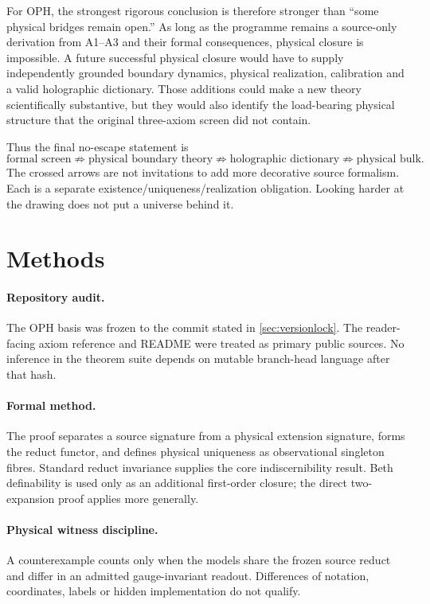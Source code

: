 \documentclass[10pt,a4paper]{article}
\theoremstyle{definition}
\theoremstyle{remark}
\begin{document}
For OPH, the strongest rigorous conclusion is therefore stronger than ``some
physical bridges remain open.''  As long as the programme remains a
source-only derivation from A1--A3 and their formal consequences, physical
closure is impossible.  A future successful physical closure would have to
supply independently grounded boundary dynamics, physical realization,
calibration and a valid holographic dictionary.  Those additions could make a
new theory scientifically substantive, but they would also identify the
load-bearing physical structure that the original three-axiom screen did not
contain.

Thus the final no-escape statement is
\[
\boxed{
\text{formal screen}
\not\Rightarrow
\text{physical boundary theory}
\not\Rightarrow
\text{holographic dictionary}
\not\Rightarrow
\text{physical bulk}.}
\]
The crossed arrows are not invitations to add more decorative source
formalism.  Each is a separate existence/uniqueness/realization obligation.
Looking harder at the drawing does not put a universe behind it.

\section*{Methods}

\paragraph{Repository audit.}
The OPH basis was frozen to the commit stated in \cref{sec:versionlock}.  The
reader-facing axiom reference and README were treated as primary public
sources.  No inference in the theorem suite depends on mutable branch-head
language after that hash.

\paragraph{Formal method.}
The proof separates a source signature from a physical extension signature,
forms the reduct functor, and defines physical uniqueness as observational
singleton fibres.  Standard reduct invariance supplies the core
indiscernibility result.  Beth definability is used only as an additional
first-order closure; the direct two-expansion proof applies more generally.

\paragraph{Physical witness discipline.}
A counterexample counts only when the models share the frozen source reduct
and differ in an admitted gauge-invariant readout.  Differences of notation,
coordinates, labels or hidden implementation do not qualify.
\end{document}
